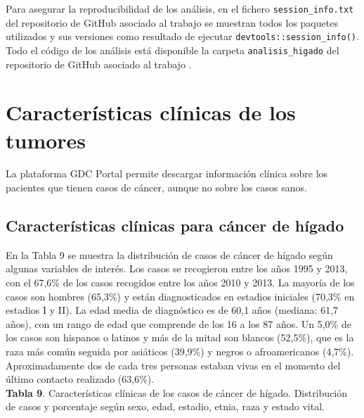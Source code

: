 Para asegurar la reproducibilidad de los análisis, en el fichero \texttt{session\_info.txt} del repositorio de GitHub asociado al trabajo \cite{Redondo-Sanchez2020} se muestran todos los paquetes utilizados y sus versiones como resultado de ejecutar \texttt{devtools::session\_info()}.\\

Todo el código de los análisis está disponible la carpeta \texttt{analisis\_higado} del repositorio de GitHub asociado al trabajo \cite{Redondo-Sanchez2020}.

\section{Características clínicas de los tumores}
 
La plataforma GDC Portal \cite{GDCPortal} permite descargar información clínica sobre los pacientes que tienen casos de cáncer, aunque no sobre los casos sanos.

\subsection{Características clínicas para cáncer de hígado}

En la Tabla 9 se muestra  la distribución de casos de cáncer de hígado según algunas variables de interés. Los casos se recogieron entre los años 1995 y 2013, con el 67,6\% de los casos recogidos entre los años 2010 y 2013. La mayoría de los casos son hombres (65,3\%) y están diagnosticados en estadios iniciales (70,3\% en estadios I y II). La edad media de diagnóstico es de 60,1 años (mediana: 61,7 años), con un rango de edad que comprende de los 16 a los 87 años. Un 5,0\% de los casos son hispanos o latinos y más de la mitad son blancos (52,5\%), que es la raza más común seguida por asiáticos (39,9\%) y negros o afroamericanos (4,7\%). Aproximadamente dos de cada tres personas estaban vivas en el momento del último contacto realizado (63,6\%).\\

\newpage
\textbf{Tabla 9}. Características clínicas de los casos de cáncer de hígado. Distribución de casos y porcentaje según sexo, edad, estadio, etnia, raza y estado vital.

